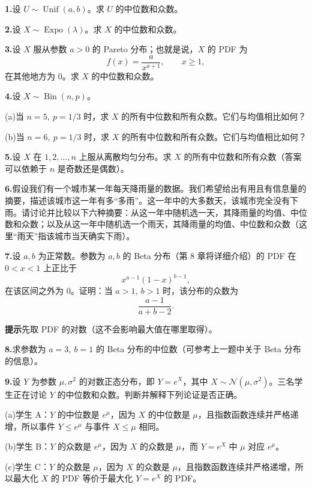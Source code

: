 \documentclass[UTF8,12pt,a4paper,fontset=fandol]{ctexart}
\begin{document}
\noindent\textbf{1.}\quad 设 $U\sim\operatorname{Unif}(a,b)$。求 $U$ 的中位数和众数。

\noindent\textbf{2.}\quad 设 $X\sim\operatorname{Expo}(\lambda)$。求 $X$ 的中位数和众数。

\noindent\textbf{3.}\quad 设 $X$ 服从参数 $a>0$ 的 Pareto 分布；也就是说，$X$ 的 PDF 为
\[
  f(x)=\frac{a}{x^{a+1}},\qquad x\ge1,
\]
在其他地方为 $0$。求 $X$ 的中位数和众数。

\noindent\textbf{4.}\quad 设 $X\sim\operatorname{Bin}(n,p)$。

\noindent (a)\quad 当 $n=5,\ p=1/3$ 时，求 $X$ 的所有中位数和所有众数。它们与均值相比如何？

\noindent (b)\quad 当 $n=6,\ p=1/3$ 时，求 $X$ 的所有中位数和所有众数。它们与均值相比如何？

\noindent\textbf{5.}\quad 设 $X$ 在 $1,2,\ldots,n$ 上服从离散均匀分布。求 $X$ 的所有中位数和所有众数（答案可以依赖于 $n$ 是奇数还是偶数）。

\noindent\textbf{6.}\quad 假设我们有一个城市某一年每天降雨量的数据。我们希望给出有用且有信息量的摘要，描述该城市这一年有多“多雨”。这一年中的大多数天，该城市完全没有下雨。请讨论并比较以下六种摘要：从这一年中随机选一天，其降雨量的均值、中位数和众数；以及从这一年中随机选一个雨天，其降雨量的均值、中位数和众数（这里“雨天”指该城市当天确实下雨）。

\noindent\textbf{7.}\quad 设 $a,b$ 为正常数。参数为 $a,b$ 的 Beta 分布（第 8 章将详细介绍）的 PDF 在 $0<x<1$ 上正比于
\[
  x^{a-1}(1-x)^{b-1},
\]
在该区间之外为 $0$。证明：当 $a>1,\ b>1$ 时，该分布的众数为
\[
  \frac{a-1}{a+b-2}.
\]

\noindent\textbf{提示}\quad 先取 PDF 的对数（这不会影响最大值在哪里取得）。

\noindent\textbf{8.}\quad 求参数为 $a=3,\ b=1$ 的 Beta 分布的中位数（可参考上一题中关于 Beta 分布的信息）。

\noindent\textbf{9.}\quad 设 $Y$ 为参数 $\mu,\sigma^2$ 的对数正态分布，即 $Y=e^X$，其中 $X\sim\mathcal{N}(\mu,\sigma^2)$。三名学生正在讨论 $Y$ 的中位数和众数。判断并解释下列论证是否正确。

\noindent (a)\quad 学生 A：$Y$ 的中位数是 $e^\mu$，因为 $X$ 的中位数是 $\mu$，且指数函数连续并严格递增，所以事件 $Y\le e^\mu$ 与事件 $X\le\mu$ 相同。

\noindent (b)\quad 学生 B：$Y$ 的众数是 $e^\mu$，因为 $X$ 的众数是 $\mu$，而 $Y=e^X$ 中 $\mu$ 对应 $e^\mu$。

\noindent (c)\quad 学生 C：$Y$ 的众数是 $\mu$，因为 $X$ 的众数是 $\mu$，且指数函数连续并严格递增，所以最大化 $X$ 的 PDF 等价于最大化 $Y=e^X$ 的 PDF。
\end{document}
